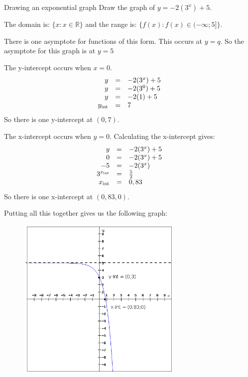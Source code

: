  
\begin{wex}{Drawing an exponential graph}
{
Draw the graph of $y=-2({3}^{x})+5$.}
{
\westep{} The domain is: $\{x:x\in \mathbb{R}\}$ and the range is: $\{f(x):f(x)\in (-\infty ;5]\}$.

\westep{} There is one asymptote for functions of this form. This occurs at $y=q$. So the asymptote for this graph is at $y=5$

\westep{} The y-intercept occurs when $x=0$.
\begin{equation*}
\begin{array}{ccc}\hfill y& =& -2(3^{x})+5\hfill \\
 \hfill y& =& -2(3^{0})+5\hfill \\
 \hfill y& =& -2(1)+5\hfill \\
 \hfill {y}_{\mathrm{int}}& =& 7
\hfill \end{array}
\end{equation*}
So there is one y-intercept at $(0,7)$.

\westep{} The x-intercept occurs when $y=0$. Calculating the x-intercept gives:
\begin{equation*}
\begin{array}{ccc}\hfill y& =& -2(3^{x})+5\hfill \\
 \hfill 0& =& -2(3^{x})+5\hfill \\
 \hfill -5& =& -2(3^{x})\hfill \\
 \hfill 3^{{x}_{\mathrm{int}}}& =& \frac{5}{2}\hfill \\
 \hfill {x}_{\mathrm{int}}& =& 0,83\hfill 
\end{array}
\end{equation*}
So there is one x-intercept at $(0,83,0)$.

\westep{} Putting all this together gives us the following graph:
\setcounter{subfigure}{0}
\begin{figure}[H] %
\begin{center}
\label{m39348*uid12329!!!underscore!!!media}\label{m39348*uid123279!!!underscore!!!printimage}\includegraphics[width=300px]{col11306.imgs/m39348_exponent1.png} %
\vspace{2pt}
\vspace{.1in}
\end{center}
\end{figure}       
}
\end{wex}





